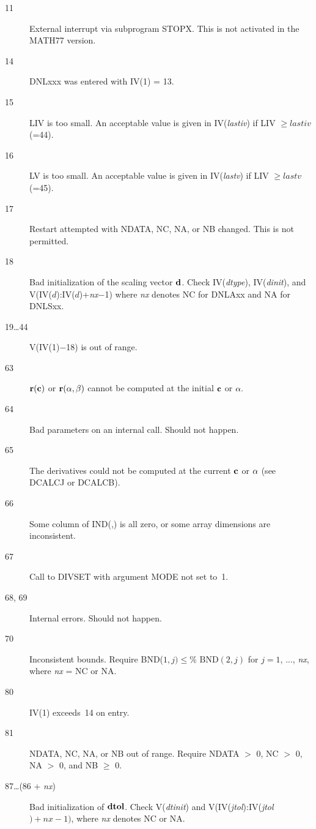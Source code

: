 \documentclass[twoside]{MATH77}
\begin{document}
\begin{description}
\item[11]  External interrupt via subprogram STOPX. This is
not activated in the MATH77 version.

\item[14]  DNLxxx was entered with IV(1) = 13.

\item[15]  LIV is too small. An acceptable value is given in
IV({\em lastiv}) if LIV $\geq lastiv$ (=44).

\item[16]  LV is too small. An acceptable value is given in
IV({\em lastv}) if LIV $\geq lastv$ (=45).

\item[17]  Restart attempted with NDATA, NC, NA, or NB
changed. This is not permitted.

\item[18]  Bad initialization of the scaling vector ${\bf d}$. Check
IV({\em dtype}), IV({\em dinit}), and V(IV($d$):IV($d$)+{\em nx}{$-$}1)
where {\em nx} denotes NC for DNLAxx and NA for DNLSxx.

\item[19\ldots 44]  V(IV(1)$-$18) is out of range.

\item[63]  ${\bf r}({\bf c})$  or ${\bf r}({\bf \alpha },{\bf \beta })$ cannot
be computed at the initial ${\bf c}$ or ${\bf \alpha }.$

\item[64]  Bad parameters on an internal call. Should not
happen.

\item[65]  The derivatives could not be computed at the current
${\bf c}$ or ${\bf \alpha }$ (see DCALCJ or DCALCB).

\item[66]  Some column of IND(,) is all zero, or some array
dimensions are inconsistent.

\item[67]  Call to DIVSET with argument MODE not set to~1.

\item[68, 69]  Internal errors. Should not happen.

\item[70]  Inconsistent bounds. Require BND($1,j)\!\leq \!\text{%
BND}(2,j)$ for $j=1$, ..., {\em nx}, where {\em nx} = NC or NA.

\item[80]  IV(1) exceeds~14 on entry.

\item[81]  NDATA, NC, NA, or NB out of range. Require NDATA $%
>$ 0, NC $>$ 0, NA $>$ 0, and NB $\geq $ 0.

\item[87\ldots (86 + {\em nx})]  Bad initialization of ${\bf dtol}$. Check
V({\em dtinit}) and V(IV({\em jtol}):IV({\em jtol}$)+nx-1)$, where {\em nx} denotes NC or NA.
\end{description}
\end{document}
